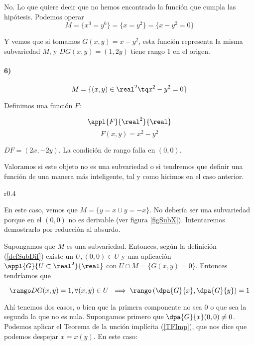   No. Lo que quiere decir que no hemos encontrado la función que cumpla las hipótesis. Podemos operar 
  \[M = \{x^3=y^6\} = \{x = y^2\}  = \{x-y^2 = 0\}\]
  
  Y vemos que si tomamos $G(x,y) = x-y^2$, esta función representa la misma subvariedad $M$, y $DG(x,y) = (1,2y)$ tiene rango 1 en el origen.
 
 
  \paragraph{6)}
  
  \[M = \{(x,y)\in \real^2 \tq x^2-y^2 = 0\}\]
  
	Definimos una función $F$:

	\[\appl{F}{\real^2}{\real}\]
	\[F(x,y) = x^2-y^2\]
  
  $DF = (2x,-2y)$. La condición de rango falla en $(0,0)$.
  
  Valoramos si este objeto no es una subvariedad o si tendremos que definir una función de una manera más inteligente, tal y como hicimos en el caso anterior.
  
  \begin{wrapfigure}{r}{0.4\textwidth}
	  \begin{center}
		  \caption{Subvariedad $M = \{ y=x \cup y = -x \}$}
		  \label{figSubX}
	  \end{center}
  \end{wrapfigure}
  
  En este caso, vemos que $M = \{ y=x \cup y = -x \}$. No debería ser una subvariedad porque en el $(0,0)$ no es derivable (ver figura \ref{figSubX}). Intentaremos demostrarlo por reducción al absurdo.
  
  Supongamos que $M$ es una subvariedad. Entonces, según la definición (\ref{defSubDif})  existe un $U, (0,0) \in U$ y una aplicación  $\appl{G}{U\subset\real^2}{\real}$ con $U\cap M = \{G(x,y) = 0\}$. Entonces tendríamos que 
  
\[\rango DG(x,y) = 1, \forall(x,y) \in U \implies \rango \left(\dpa{G}{x},\dpa{G}{y}\right) = 1\]

Ahí tenemos dos casos, o bien que la primera componente no sea $0$ o que sea la segunda la que no es nula. Supongamos primero que $\dpa{G}{x}(0,0) \neq 0$. Podemos aplicar el Teorema de la unción implícita (\ref{TFImp}), que nos dice que podemos despejar $x = x(y)$. En este caso:

